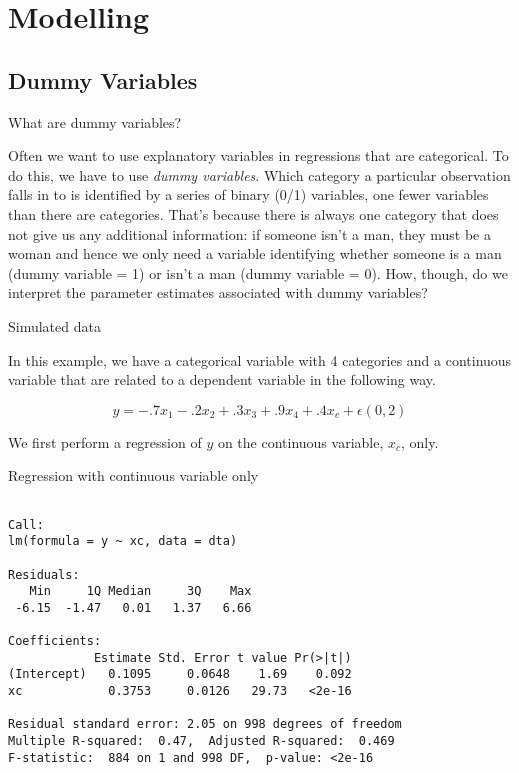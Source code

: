 \documentclass[10pt,ignorenonframetext,]{beamer}
\begin{document}
\section{Modelling}\label{modelling}

\subsection{Dummy Variables}\label{dummy-variables}

\begin{frame}{What are dummy variables?}

Often we want to use explanatory variables in regressions that are
categorical. To do this, we have to use \emph{dummy variables}. Which
category a particular observation falls in to is identified by a series
of binary (0/1) variables, one fewer variables than there are
categories. That's because there is always one category that does not
give us any additional information: if someone isn't a man, they must be
a woman and hence we only need a variable identifying whether someone is
a man (dummy variable = 1) or isn't a man (dummy variable = 0). How,
though, do we interpret the parameter estimates associated with dummy
variables?

\end{frame}

\begin{frame}{Simulated data}

In this example, we have a categorical variable with 4 categories and a
continuous variable that are related to a dependent variable in the
following way.

\[
y = -.7 x_1 - .2 x_2 + .3 x_3 + .9 x_4 + .4 x_c + \epsilon(0,2)
\]

We first perform a regression of \(y\) on the continuous variable,
\(x_c\), only.

\end{frame}

\begin{frame}[fragile]{Regression with continuous variable only}

\begin{verbatim}

Call:
lm(formula = y ~ xc, data = dta)

Residuals:
   Min     1Q Median     3Q    Max
 -6.15  -1.47   0.01   1.37   6.66

Coefficients:
            Estimate Std. Error t value Pr(>|t|)
(Intercept)   0.1095     0.0648    1.69    0.092
xc            0.3753     0.0126   29.73   <2e-16

Residual standard error: 2.05 on 998 degrees of freedom
Multiple R-squared:  0.47,  Adjusted R-squared:  0.469
F-statistic:  884 on 1 and 998 DF,  p-value: <2e-16
\end{verbatim}

\end{frame}
\end{document}
